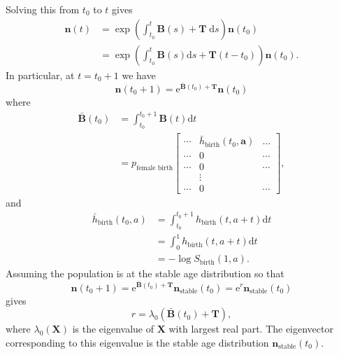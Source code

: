 \documentclass[12pt]{article}
\renewcommand{\vec}[1]{\mathbf{#1}}
\newcommand{\mat}[1]{\mathbf{#1}}
\newcommand{\md}{\mathrm{d}}
\newcommand{\me}{\mathrm{e}}
\begin{document}
Solving this from $t_0$ to $t$ gives
\begin{equation}
  \begin{split}
    \vec{n}(t)
    &= \exp\left(\int_{t_0}^t \mat{B}(s) + \mat{T}\;\mathrm{d}s\right)
    \vec{n}(t_0)\\
    &= \exp\left(\int_{t_0}^t \mat{B}(s) \mathrm{d}s
      + \mat{T} (t - t_0)\right)
    \vec{n}(t_0).
  \end{split}
\end{equation}
In particular, at $t = t_0 + 1$ we have
\begin{equation}
  \vec{n}(t_0 + 1)
  = \me^{\bar{\mat{B}}(t_0) + \mat{T}} \vec{n}(t_0)
\end{equation}
where
\begin{equation}
  \begin{split}
    \bar{\mat{B}}(t_0) &=
    \int_{t_0}^{t_0 + 1} \mat{B}(t) \md t\\
    &=
    p_{\text{female birth}}
    \begin{bmatrix}
      \cdots & \bar{h}_{\text{birth}}(t_0, \vec{a}) & \dots
      \\
      \cdots & 0 & \cdots
      \\
      \cdots & 0 & \cdots
      \\
      & \vdots &
      \\
      \cdots & 0 & \cdots
    \end{bmatrix},
  \end{split}
\end{equation}
and
\begin{equation}
  \begin{split}
    \bar{h}_{\text{birth}}(t_0, a)
    &= \int_{t_0}^{t_0 + 1} h_{\text{birth}}(t, a + t) \md t \\
    &= \int_0^1 h_{\text{birth}}(t, a + t) \md t \\
    &= - \log S_{\text{birth}}(1, a).
  \end{split}
\end{equation}
Assuming the population is at the stable age distribution so that
\begin{equation}
  \vec{n}(t_0 + 1)
  = \me^{\bar{\mat{B}}(t_0) + \mat{T}} \vec{n}_{\text{stable}}(t_0)
 = \me^r \vec{n}_{\text{stable}}(t_0)
\end{equation}
gives
\begin{equation}
  r = \lambda_0\left(\bar{\mat{B}}(t_0) + \mat{T}\right),
\end{equation}
where $\lambda_0(\mat{X})$ is the eigenvalue of $\mat{X}$ with largest
real part.  The eigenvector corresponding to this eigenvalue is the
stable age distribution $\vec{n}_{\text{stable}}(t_0)$.
\end{document}
